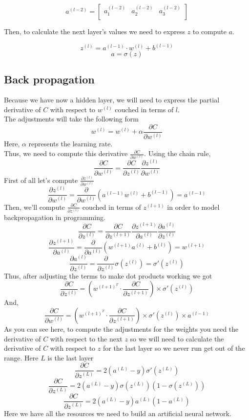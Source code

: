 \documentclass[]{report}
\begin{document}
\[a^{(l-2)}=\begin{bmatrix}
a^{(l-2)}_1 & a^{(l-2)}_2 & a^{(l-2)}_3 \\
\end{bmatrix}\]

{Then, to calculate the next layer's values we need to express $z$ to compute $a$.}

\[z^{(l)}=a^{(l-1)} \cdot w^{(l)}+b^{(l-1)}\]
\[a=\sigma (z)\]

\subsection{Back propagation}
{Because we have now a hidden layer, we will need to express the partial derivative of $C$ with respect to $w^{(l)}$ couched in terms of $l$.}\\
{The adjustments will take the following form}
\[w^{(l)}=w^{(l)}+\alpha \frac{\partial C}{\partial w^{(l)}}\]
{Here, $\alpha$ represents the learning rate.}\\
{Thus, we need to compute this derivative $\frac{\partial C}{\partial w^{(l)}}$.}
{Using the chain rule,}
\[\frac{\partial C}{\partial w^{(l)}}=\frac{\partial C}{\partial z^{(l)}} \frac{\partial z^{(l)}}{\partial w^{(l)}}\]
{First of all let's compute $\frac{\partial z^{(l)}}{\partial w^{(l)}}$}
\[\frac{\partial z^{(l)}}{\partial w^{(l)}} = \frac{\partial}{\partial w^{(l)}} \left( a^{(l-1)} w^{(l)} + b^{(l-1)} \right)=a^{(l-1)}\]
{Then, we'll compute $\frac{\partial C}{\partial z^{(l)}}$ couched in terms of $z^{(l+1)}$ in order to model backpropagation in programming.}
\[\frac{\partial C}{\partial z^{(l)}}=\frac{\partial C}{\partial z^{(l+1)}}\frac{\partial z^{(l+1)}}{\partial a^{(l)}}\frac{\partial a^{(l)}}{\partial z^{(l)}}\]
\[\frac{\partial z^{(l+1)}}{\partial a^{(l)}}=\frac{\partial}{\partial a^{(l)}} \left(w^{(l+1)} a^{(l)} + b^{(l)}\right)=w^{(l+1)}\]
\[\frac{\partial a^{(l)}}{\partial z^{(l)}}=\frac{\partial}{\partial z^{(l)}} \sigma \left(z^{(l)}\right)=\sigma\prime\left(z^{(l)}\right)\]
{Thus, after adjusting the terms to make dot products working we got}
\[\frac{\partial C}{\partial z^{(l)}}=\left(w^{(l+1)^{T}} \cdot \frac{\partial C}{\partial z^{(l+1)}} \right) \times \sigma\prime\left(z^{(l)}\right)\]
{And,}
\[\frac{\partial C}{\partial w^{(l)}}=\left(w^{(l+1)^{T}} \cdot \frac{\partial C}{\partial z^{(l+1)}} \right) \times \sigma\prime\left(z^{(l)}\right) \times a^{(l-1)}\]
{As you can see here, to compute the adjustments for the weights you need the derivative of $C$ with respect to the next $z$ so we will need to calculate the derivative of $C$ with respect to $z$ for the last layer so we never run get out of the range.}
{Here $L$ is the last layer}
\[\frac{\partial C}{\partial z^{(L)}}=2(a^{(L)}-y) \sigma\prime\left(z^{(L)}\right)\]
\[\frac{\partial C}{\partial z^{(L)}}=2(a^{(L)}-y)\sigma\left(z^{(L)}\right)\left(1-\sigma\left(z^{(L)}\right)\right)\]
\[\frac{\partial C}{\partial z^{(L)}}=2(a^{(L)}-y)a^{(L)}\left(1-a^{(L)}\right)\]
{Here we have all the resources we need to build an artificial neural network.}
\end{document}
